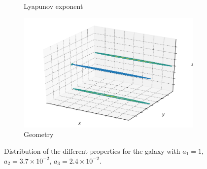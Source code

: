 \begin{figure}[h]
\begin{subfigure}[t]{0.4\textwidth}
        \caption{Lyapunov exponent}
    \end{subfigure}
    \begin{subfigure}[t]{0.4\textwidth}
        \includegraphics[width=\textwidth]{"../Files/Week 13/images/22_ellipsoid"}
        \caption{Geometry}
    \end{subfigure}
    \caption{Distribution of the different properties for the galaxy with $a_1 = 1$, $a_2 = 3.7\times10^{-2}$, $a_3 = 2.4\times10^{-2}$.}
\end{figure}


